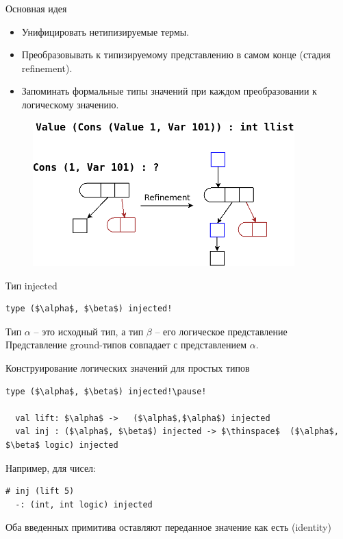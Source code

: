 \documentclass[10pt, mathserif]{beamer}
\theoremstyle{definition}
\begin{document}
\begin{frame}[fragile]{Основная идея}
\begin{itemize}
 \item Унифицировать нетипизируемые термы.
 \item Преобразовывать к типизируемому представлению в самом конце (стадия refinement).
 \item Запоминать формальные типы значений при каждом преобразовании к логическому значению.
\end{itemize}

\begin{figure}
\centering
\includegraphics[width=0.9\textwidth]{img5.png}
\end{figure}
\end{frame}

\begin{frame}[fragile]{Тип injected}
  \begin{lstlisting}[mathescape=true]
  type ($\alpha$, $\beta$) injected!
  \end{lstlisting}

\vskip 1cm
  Тип $\alpha$ -- это исходный тип, а тип $\beta$ -- его логическое представление
\vskip 1cm
  Представление ground-типов совпадает с представлением $\alpha$.
\end{frame}

\begin{frame}[fragile]{Конструирование логических значений для простых типов}
  \begin{lstlisting}[mathescape=true]
  type ($\alpha$, $\beta$) injected!\pause!

  val lift: $\alpha$ ->   ($\alpha$,$\alpha$) injected
  val inj : ($\alpha$, $\beta$) injected -> $\thinspace$  ($\alpha$, $\beta$ logic) injected
  \end{lstlisting}
  \pause\vskip 1cm
  Например, для чисел:
  \begin{lstlisting}[mathescape=true]
  # inj (lift 5)
  -: (int, int logic) injected
  \end{lstlisting}
  \pause
  Оба введенных примитива оставляют переданное значение как есть (identity)
\end{frame}
\end{document}
